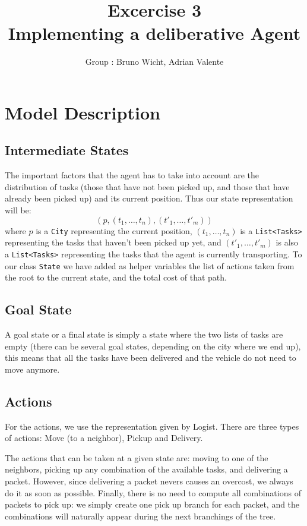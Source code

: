 \documentclass[11pt]{article}
\title{\bf Excercise 3\\ Implementing a deliberative Agent}
\author{Group \textnumero : Bruno Wicht, Adrian Valente}
\begin{document}
\maketitle

\section{Model Description}

\subsection{Intermediate States}
The important factors that the agent has to take into account are the distribution of tasks (those that have not been picked up, and those that have already been picked up) and its current position. Thus our state representation will be:
$$ (p, (t_1,\dots,t_n), (t'_1,\dots,t'_m)) $$
where $p$ is a \texttt{City} representing the current position, $(t_1,\dots,t_n)$ is a \texttt{List<Tasks>} representing the tasks that haven't been picked up yet, and $(t'_1,\dots,t'_m)$ is also a \texttt{List<Tasks>} representing the tasks that the agent is currently transporting. To our class \texttt{State} we have added as helper variables the list of actions taken from the root to the current state, and the total cost of that path.

\subsection{Goal State}
A goal state or a final state is simply a state where the two lists of tasks are empty (there can be several goal states, depending on the city where we end up), this means that all the tasks have been delivered and the vehicle do not need to move anymore. 

\subsection{Actions}
For the actions, we use the representation given by Logist. There are three types of actions: Move (to a neighbor), Pickup and Delivery. 

The actions that can be taken at a given state are: moving to one of the neighbors, picking up any combination of the available tasks, and delivering a packet. However, since delivering a packet nevers causes an overcost, we always do it as soon as possible. Finally, there is no need to compute all combinations of packets to pick up: we simply create one pick up branch for each packet, and the combinations will naturally appear during the next branchings of the tree.
\end{document}

